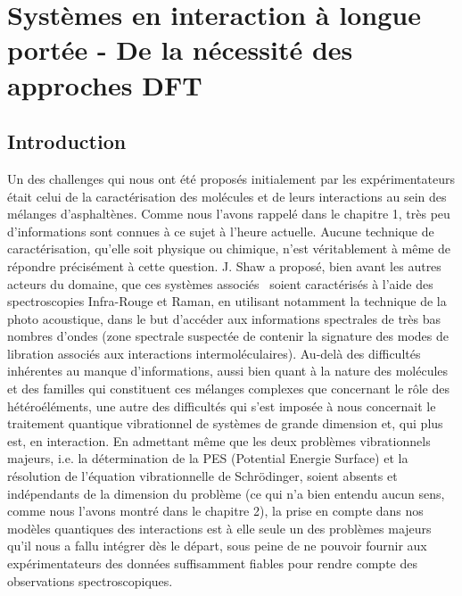 	\chapter[Interactions à longue portée]{Systèmes en interaction à longue portée - De la nécessité des approches DFT}
	\renewcommand{\chaptername}{Chapitre}
	\minitoc
	\restoregeometry
	
	\newpage
	
	\section*{Introduction}
	
	Un des challenges qui nous ont été proposés initialement par les expérimentateurs était celui de la caractérisation des molécules et de leurs interactions au sein des mélanges d’asphaltènes. Comme nous l’avons rappelé dans le chapitre 1, très peu d’informations sont connues à ce sujet à l’heure actuelle. Aucune technique de caractérisation, qu'elle soit physique ou chimique, n’est véritablement à même de répondre précisément à cette question. J. Shaw a proposé, bien avant les autres acteurs du domaine, que ces systèmes \og associés \fg{} soient caractérisés à l’aide des spectroscopies Infra-Rouge et Raman, en utilisant notamment la technique de la photo acoustique, dans le but d’accéder aux informations spectrales de très bas nombres d’ondes (zone spectrale suspectée de contenir la signature des modes de libration associés aux interactions intermoléculaires). Au-delà des difficultés inhérentes au manque d’informations, aussi bien quant à la nature des molécules et des familles qui constituent ces mélanges complexes que concernant le rôle des hétéroéléments, une autre des difficultés qui s’est imposée à nous concernait le traitement quantique vibrationnel de systèmes de grande dimension et, qui plus est, en interaction. En admettant même que les deux problèmes vibrationnels majeurs, i.e. la détermination de la PES (Potential Energie Surface) et la résolution de l’équation vibrationnelle de Schr\"{o}dinger, soient absents et indépendants de la dimension du problème (ce qui n’a bien entendu aucun sens, comme nous l’avons montré dans le chapitre 2), la prise en compte dans nos modèles quantiques des interactions est à elle seule un des problèmes majeurs qu’il nous a fallu intégrer dès le départ, sous peine de ne pouvoir fournir aux expérimentateurs des données suffisamment fiables pour rendre compte des observations spectroscopiques. 
	
